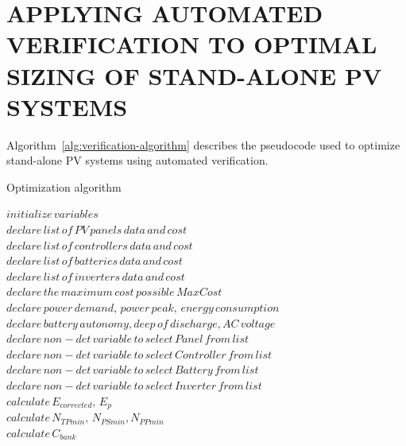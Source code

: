 \documentclass[10pt,conference]{IEEEtran}
\begin{document}
\section{APPLYING AUTOMATED VERIFICATION TO OPTIMAL SIZING OF STAND-ALONE PV SYSTEMS}
Algorithm~\ref{alg:verification-algorithm} describes the pseudocode used to optimize stand-alone PV systems using automated verification. 
%
 \begin{algorithm}
 \caption{Optimization algorithm}
 \begin{algorithmic}[1]
 \begin{scriptsize}
 
 \renewcommand{\algorithmicrequire}{\textbf{Input:}}
 \renewcommand{\algorithmicensure}{\textbf{Output:}}
  \STATE $initialize \, variables$ \\
  \STATE $declare \, list \, of \, PV \, panels \, data \, and \, cost $ \\
  \STATE $declare \, list \, of \, controllers \, data \, and \, cost $ \\
  \STATE $declare \, list \, of \, batteries \, data \,  and \, cost $ \\
  \STATE $declare \, list \, of \, inverters \, data \,  and \, cost $ \\
  \STATE $declare \, the \, maximum \, cost \, possible \, MaxCost $  \\
  \STATE $declare \, power \, demand, \, power \, peak, \, energy \, consumption $ \\
  \STATE $declare \, battery\,  autonomy, deep \, of \, discharge, AC \, voltage$ \\
 	\STATE $declare \, non-det \, variable \, to \, select \, Panel \, from \, list$ \\
 	\STATE $declare \, non-det \, variable \, to \, select \, Controller \, from \, list $ \\
 	\STATE $declare \, non-det \, variable \, to \, select \, Battery \, from \, list $ \\
 	\STATE $declare \, non-det \, variable \, to \, select \, Inverter \, from \, list $ \\ 	
 	\STATE $calculate \, E_{corrected}, \, E_{p} $ \\
	\STATE $calculate \, N_{TPmin}, \, N_{PSmin}, N_{PPmin} $ \\
 	\STATE $calculate \, C_{bank}$ \\

\end{scriptsize}
\end{algorithmic}
\end{algorithm}
\end{document}
